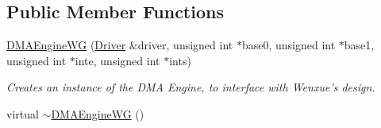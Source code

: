 \subsection*{Public Member Functions}
\begin{CompactItemize}
\item 
\hyperlink{classmprace_1_1DMAEngineWG_a0}{DMAEngine\-WG} (\hyperlink{classmprace_1_1Driver}{Driver} \&driver, unsigned int $\ast$base0, unsigned int $\ast$base1, unsigned int $\ast$inte, unsigned int $\ast$ints)
\begin{CompactList}\small\item\em Creates an instance of the DMA Engine, to interface with Wenxue's design. \item\end{CompactList}\item 
\hypertarget{classmprace_1_1DMAEngineWG_a1}{
virtual \hyperlink{classmprace_1_1DMAEngineWG_a1}{$\sim$DMAEngine\-WG} ()}
\label{classmprace_1_1DMAEngineWG_a1}


\end{CompactItemize}
